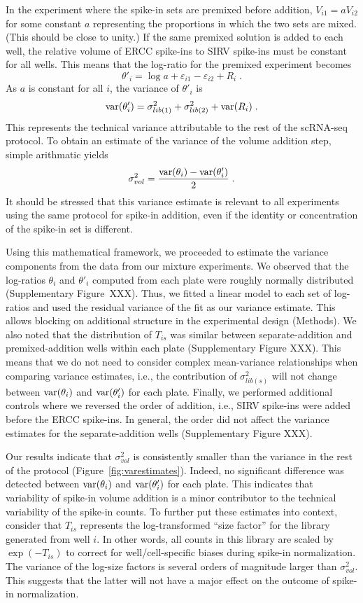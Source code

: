 \documentclass{article}
\begin{document}
In the experiment where the spike-in sets are premixed before addition, $V_{i1}=aV_{i2}$ for some constant $a$ representing the proportions in which the two sets are mixed.
(This should be close to unity.)
If the same premixed solution is added to each well, the relative volume of ERCC spike-ins to SIRV spike-ins must be constant for all wells.
This means that the log-ratio for the premixed experiment becomes
\[
\theta'_i = \log a + \varepsilon_{i1} - \varepsilon_{i2} + R_i \;.
\]
As $a$ is constant for all $i$, the variance of $\theta'_i$ is
\[
\mbox{var}(\theta'_i) = \sigma^2_{lib(1)} + \sigma^2_{lib(2)} + \mbox{var}(R_i) \;.
\]
This represents the technical variance attributable to the rest of the scRNA-seq protocol.
To obtain an estimate of the variance of the volume addition step, simple arithmatic yields
\[
\sigma^2_{vol} = \frac{\mbox{var}(\theta_i) - \mbox{var}(\theta'_i)}{2} \;.
\]
It should be stressed that this variance estimate is relevant to all experiments using the same protocol for spike-in addition, even if the identity or concentration of the spike-in set is different.

Using this mathematical framework, we proceeded to estimate the variance components from the data from our mixture experiments.
We observed that the log-ratios $\theta_i$ and $\theta'_i$ computed from each plate were roughly normally distributed (Supplementary Figure~XXX).
Thus, we fitted a linear model to each set of log-ratios and used the residual variance of the fit as our variance estimate.
This allows blocking on additional structure in the experimental design (Methods).
We also noted that the distribution of $T_{is}$ was similar between separate-addition and premixed-addition wells within each plate (Supplementary Figure XXX).
This means that we do not need to consider complex mean-variance relationships when comparing variance estimates, i.e., the contribution of $\sigma^2_{lib(s)}$ will not change between $\mbox{var}(\theta_i)$ and $\mbox{var}(\theta'_i)$ for each plate.
Finally, we performed additional controls where we reversed the order of addition, i.e., SIRV spike-ins were added before the ERCC spike-ins.
In general, the order did not affect the variance estimates for the separate-addition wells (Supplementary Figure XXX).

Our results indicate that $\sigma^2_{vol}$ is consistently smaller than the variance in the rest of the protocol (Figure~\ref{fig:varestimates}).
Indeed, no significant difference was detected between $\mbox{var}(\theta_i)$ and $\mbox{var}(\theta'_i)$ for each plate.
This indicates that variability of spike-in volume addition is a minor contributor to the technical variability of the spike-in counts.
To further put these estimates into context, consider that $T_{is}$ represents the log-transformed ``size factor'' for the library generated from well $i$.
In other words, all counts in this library are scaled by $\exp(-T_{is})$ to correct for well/cell-specific biases during spike-in normalization.
The variance of the log-size factors is several orders of magnitude larger than $\sigma^2_{vol}$.
This suggests that the latter will not have a major effect on the outcome of spike-in normalization.
\end{document}
